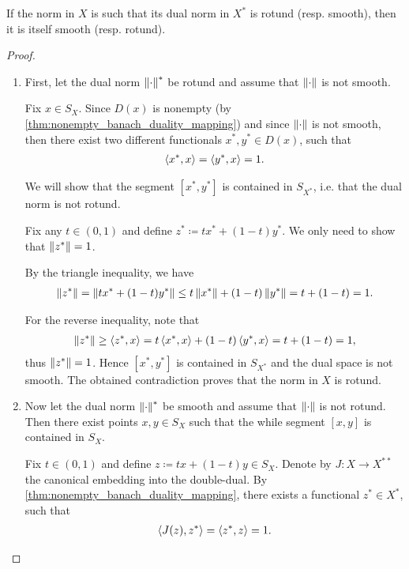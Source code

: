 \begin{theorem}\label{thm:smooth_rotund_norm_duality}\cite[exercise 2.37(a)]{Phelps1993}
  If the norm in \( X \) is such that its dual norm in \( X^* \) is rotund (resp. smooth), then it is itself smooth (resp. rotund).
\end{theorem}
\begin{proof}\mbox{}
  \begin{enumerate}
    \item First, let the dual norm \( \left\Vert \cdot \right\Vert^* \) be rotund and assume that \( \left\Vert \cdot \right\Vert \) is not smooth.

    Fix \( x \in S_X \). Since \( D(x) \) is nonempty (by \cref{thm:nonempty_banach_duality_mapping}) and since \( \left\Vert \cdot \right\Vert \) is not smooth, then there exist two different functionals \( x^*, y^* \in D(x) \), such that
    \begin{align*}
      \left\langle x^*, x \right\rangle
      =
      \left\langle y^*, x \right\rangle
      =
      1.
    \end{align*}

    We will show that the segment \( [x^*, y^*] \) is contained in \( S_{X^*} \), i.e. that the dual norm is not rotund.

    Fix any \( t \in (0, 1) \) and define \( z^* \coloneqq t x^* + (1-t) y^* \). We only need to show that \( \left\Vert z^* \right\Vert = 1 \).

    By the triangle inequality, we have
    \begin{align*}
      \left\Vert z^* \right\Vert
      =
      \left\Vert t x^* + (1-t) y^* \right\Vert
      \leq
      t \left\Vert x^* \right\Vert + (1-t) \left\Vert y^* \right\Vert
      =
      t + (1-t)
      =
      1.
    \end{align*}

    For the reverse inequality, note that
    \begin{align*}
      \left\Vert z^* \right\Vert
      \geq
      \left\langle z^*, x \right\rangle
      =
      t \left\langle x^*, x \right\rangle + (1-t) \left\langle y^*, x \right\rangle
      =
      t + (1-t)
      =
      1,
    \end{align*}
    thus \( \left\Vert z^* \right\Vert = 1 \). Hence \( [x^*, y^*] \) is contained in \( S_{X^*} \) and the dual space is not smooth. The obtained contradiction proves that the norm in \( X \) is rotund.

    \item Now let the dual norm \( \left\Vert \cdot \right\Vert^* \) be smooth and assume that \( \left\Vert \cdot \right\Vert \) is not rotund. Then there exist points \( x, y \in S_X \) such that the while segment \( [x, y] \) is contained in \( S_X \).

    Fix \( t \in (0, 1) \) and define \( z \coloneqq tx + (1-t)y \in S_X \). Denote by \( J: X \to X^{**} \) the canonical embedding into the double-dual. By \cref{thm:nonempty_banach_duality_mapping}, there exists a functional \( z^* \in X^* \), such that
    \begin{align*}
      \left\langle J(z), z^* \right\rangle
      =
      \left\langle z^*, z \right\rangle
      =
      1.
    \end{align*}


\end{enumerate}
\end{proof}
